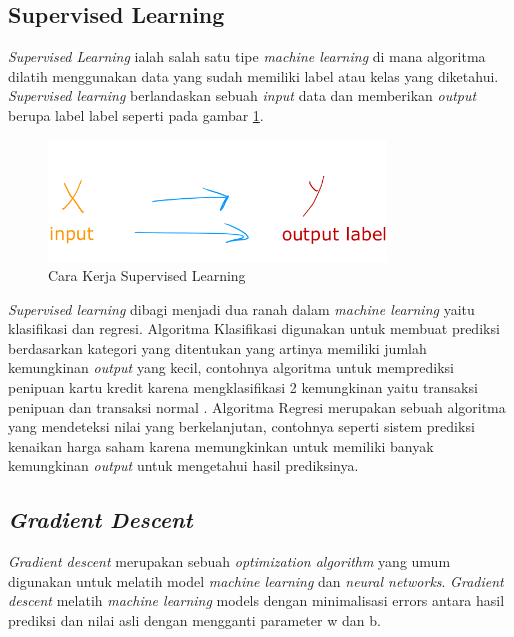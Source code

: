 \subsection{Supervised Learning} \label{II.Supervised Learning}
\textit{Supervised Learning} ialah salah satu tipe \textit{machine learning} di mana algoritma dilatih menggunakan data yang sudah memiliki label atau kelas yang diketahui. \textit{Supervised learning} berlandaskan sebuah \textit{input} data dan memberikan \textit{output} berupa label label seperti pada gambar \ref{fig:2.carasupervised}\cite{cunningham2008supervised}.
\begin{figure}[H] %
    \centering
    \includegraphics[width=0.8\textwidth]{figure/image.png}
    \caption{Cara Kerja Supervised Learning}
    \label{fig:2.carasupervised}
\end{figure}
\textit{Supervised learning} dibagi menjadi dua ranah dalam \textit{machine learning} yaitu klasifikasi dan regresi\cite{cunningham2008supervised}. Algoritma Klasifikasi digunakan untuk membuat prediksi berdasarkan kategori yang ditentukan yang artinya memiliki jumlah kemungkinan \textit{output} yang kecil, contohnya algoritma untuk memprediksi penipuan kartu kredit karena mengklasifikasi 2 kemungkinan yaitu transaksi penipuan dan transaksi normal \cite{cunningham2008supervised}. Algoritma Regresi merupakan sebuah algoritma yang mendeteksi nilai yang berkelanjutan, contohnya seperti sistem prediksi kenaikan harga saham karena memungkinkan untuk memiliki banyak kemungkinan \textit{output} untuk mengetahui hasil prediksinya\cite{cunningham2008supervised}. 


\subsection{\textit{Gradient Descent}} \label{II.Gradient Descent}
\textit{Gradient descent} merupakan sebuah \textit{optimization algorithm} yang umum digunakan untuk melatih model \textit{machine learning} dan \textit{neural networks}\cite{hochreiter2001learning}. \textit{Gradient descent} melatih \textit{machine learning} models dengan minimalisasi errors antara hasil prediksi dan nilai asli dengan mengganti parameter w dan b\cite{hochreiter2001learning}.

